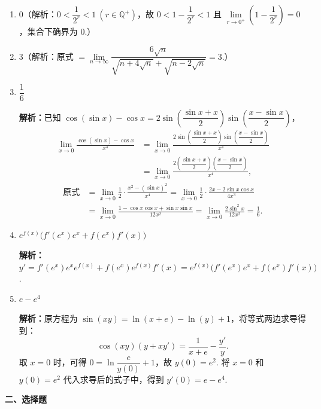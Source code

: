 \documentclass[a4paper,11pt]{ctexart}
\begin{document}
\begin{enumerate}[label=\arabic*., leftmargin=2em, itemsep=0.7em, topsep=0.4em]
  \item $0$\quad（解析：$0<\dfrac{1}{2^r}<1\ (r\in\mathbb{Q}^+)$，故 $0<1-\dfrac{1}{2^r}<1$ 且 $\lim\limits_{r\to 0^+}\left(1-\dfrac{1}{2^r}\right)=0$，集合下确界为 $0$.）

  \item $3$\quad（解析：原式 $=\lim\limits_{n\to\infty}\dfrac{6\sqrt{n}}{\sqrt{n+4\sqrt{n}}+\sqrt{n-2\sqrt{n}}}=3$.）

  \item $\dfrac{1}{6}$

  \textbf{解析：}已知 $\cos(\sin x)-\cos x=2\sin\left(\dfrac{\sin x+x}{2}\right)\sin\left(\dfrac{x-\sin x}{2}\right)$，
  \begin{align*}
    \lim_{x\to 0}\frac{\cos(\sin x)-\cos x}{x^4}
    &= \lim_{x\to 0}\frac{2\sin\left(\dfrac{\sin x+x}{2}\right)\sin\left(\dfrac{x-\sin x}{2}\right)}{x^4} \\
    &= \lim_{x\to 0}\frac{2\left(\dfrac{\sin x+x}{2}\right)\left(\dfrac{x-\sin x}{2}\right)}{x^4},
  \end{align*}
  \begin{align*}
    \text{原式} &= \lim_{x\to 0}\frac{1}{2}\cdot\frac{x^2-(\sin x)^2}{x^4}
    = \lim_{x\to 0}\frac{1}{2}\cdot\frac{2x-2\sin x\cos x}{4x^3} \\
    &= \lim_{x\to 0}\frac{1-\cos x\cos x+\sin x\sin x}{12x^2}
    = \lim_{x\to 0}\frac{2\sin^2 x}{12x^2}
    = \frac{1}{6}.
  \end{align*}

  \item $e^{f(x)}\bigl(f'(e^x)e^x+f(e^x)f'(x)\bigr)$

  \textbf{解析：}$y'=f'(e^x)e^x e^{f(x)}+f(e^x)e^{f(x)}f'(x)=e^{f(x)}\bigl(f'(e^x)e^x+f(e^x)f'(x)\bigr)$.

  \item $e-e^4$

  \textbf{解析：}原方程为 $\sin(xy)=\ln(x+e)-\ln(y)+1$，将等式两边求导得到：
  \[
    \cos(xy)(y+xy')=\frac{1}{x+e}-\frac{y'}{y}.
  \]
  取 $x=0$ 时，可得 $0=\ln\dfrac{e}{y(0)}+1$，故 $y(0)=e^2$. 将 $x=0$ 和 $y(0)=e^2$ 代入求导后的式子中，得到 $y'(0)=e-e^4$.
\end{enumerate}

\vspace{0.6em}
\textbf{二、选择题}
\end{document}
